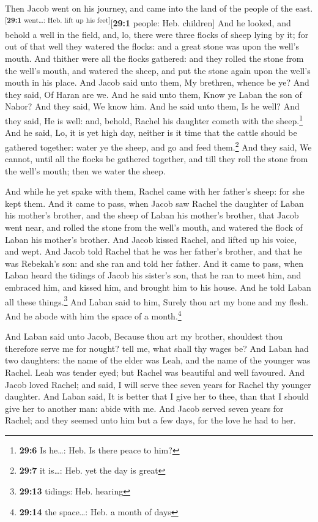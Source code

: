  Then Jacob went on his journey, and came into the land of
the people of the east.\textsuperscript{{[}\textbf{29:1} went\ldots:
Heb. lift up his feet{]}}{[}\textbf{29:1} people: Heb. children{]}
 And he looked, and behold a well in the field, and, lo,
there were three flocks of sheep lying by it; for out of that well they
watered the flocks: and a great stone was upon the well's mouth.
 And thither were all the flocks gathered: and they rolled
the stone from the well's mouth, and watered the sheep, and put the
stone again upon the well's mouth in his place.  And Jacob
said unto them, My brethren, whence be ye? And they said, Of Haran are
we.  And he said unto them, Know ye Laban the son of
Nahor? And they said, We know him.  And he said unto them,
Is he well? And they said, He is well: and, behold, Rachel his daughter
cometh with the sheep.\footnote{\textbf{29:6} Is he\ldots: Heb. Is there
  peace to him?}  And he said, Lo, it is yet high day,
neither is it time that the cattle should be gathered together: water ye
the sheep, and go and feed them.\footnote{\textbf{29:7} it is\ldots:
  Heb. yet the day is great}  And they said, We cannot,
until all the flocks be gathered together, and till they roll the stone
from the well's mouth; then we water the sheep.

 And while he yet spake with them, Rachel came with her
father's sheep: for she kept them.  And it came to pass,
when Jacob saw Rachel the daughter of Laban his mother's brother, and
the sheep of Laban his mother's brother, that Jacob went near, and
rolled the stone from the well's mouth, and watered the flock of Laban
his mother's brother.  And Jacob kissed Rachel, and
lifted up his voice, and wept.  And Jacob told Rachel
that he was her father's brother, and that he was Rebekah's son: and she
ran and told her father.  And it came to pass, when Laban
heard the tidings of Jacob his sister's son, that he ran to meet him,
and embraced him, and kissed him, and brought him to his house. And he
told Laban all these things.\footnote{\textbf{29:13} tidings: Heb.
  hearing}  And Laban said to him, Surely thou art my
bone and my flesh. And he abode with him the space of a
month.\footnote{\textbf{29:14} the space\ldots: Heb. a month of days}

 And Laban said unto Jacob, Because thou art my brother,
shouldest thou therefore serve me for nought? tell me, what shall thy
wages be?  And Laban had two daughters: the name of the
elder was Leah, and the name of the younger was Rachel. 
Leah was tender eyed; but Rachel was beautiful and well favoured.
 And Jacob loved Rachel; and said, I will serve thee
seven years for Rachel thy younger daughter.  And Laban
said, It is better that I give her to thee, than that I should give her
to another man: abide with me.  And Jacob served seven
years for Rachel; and they seemed unto him but a few days, for the love
he had to her.

